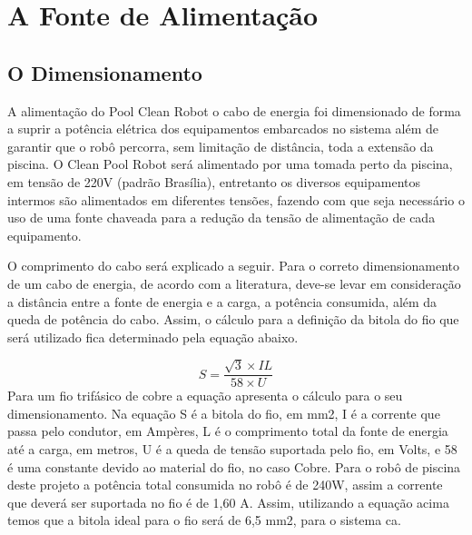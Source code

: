 \section{A Fonte de Alimentação}
\subsection{O Dimensionamento}
A alimentação do Pool Clean Robot o cabo de energia foi dimensionado de forma a suprir a potência elétrica dos equipamentos embarcados no sistema além de garantir que o robô percorra, sem limitação de distância, toda a extensão da piscina. O Clean Pool Robot será alimentado por uma tomada perto da piscina, em tensão de 220V (padrão Brasília), entretanto os diversos equipamentos intermos são alimentados em diferentes tensões, fazendo com que seja necessário o uso de uma fonte chaveada para a redução da tensão de alimentação de cada equipamento.

O comprimento do cabo será explicado a seguir. Para o correto dimensionamento de um cabo de energia, de acordo com a literatura, deve-se levar em consideração a distância entre a fonte de energia e a carga, a potência consumida, além da queda de potência do cabo. Assim, o cálculo para a definição da bitola do fio que será utilizado fica determinado pela equação abaixo.

\begin{displaymath}
  S = \frac{\sqrt{3} \times IL}{58 \times U}
\end{displaymath}
Para um fio trifásico de cobre a equação apresenta o cálculo para o seu dimensionamento. Na equação S é a bitola do fio, em mm2, I é a corrente que passa pelo condutor, em Ampères, L é o comprimento total da fonte de energia até a carga, em metros, U é a queda de tensão suportada pelo fio, em Volts, e 58 é uma constante devido ao material do fio, no caso Cobre. Para o robô de piscina deste projeto a potência total consumida no robô é de 240W, assim a corrente que deverá ser suportada no fio é de 1,60 A. Assim, utilizando a equação acima temos que a bitola ideal para o fio será de 6,5 mm2, para o sistema ca.

